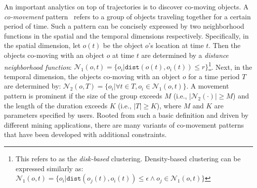 An important analytics on top of trajectories is to discover co-moving objects. A \emph{co-movement} pattern~\cite{li2013effective,zheng2015survey} 
refers to a group of objects traveling together for a certain period of time.
Such a pattern can be concisely expressed by two neighborhood functions in the spatial and the temporal dimensions respectively.
Specifically, in the spatial dimension, let $o(t)$ be the object $o$'s location at time $t$.
Then the objects co-moving with an object $o$
at time $t$ are determined by a 
\emph{distance neighborhood function}:
$\mathcal{N}_1(o,t) = \{o_i | \mathtt{dist}(o(t), o_i(t)) \leq r \}$\footnote{This refers to as the \emph{disk-based} clustering. Density-based clustering can be expressed similarly as: $\mathcal{N}_1(o,t) = \{o_i | \mathtt{dist}(o_j(t), o_i(t)) \leq \epsilon \wedge o_j \in \mathcal{N}_1(o,t) \}$}. Next, in the temporal dimension, the objects co-moving with an object $o$ for a time period $T$ are determined by: $\mathcal{N}_2(o, T) = \{o_i | \forall t \in T, o_i \in \mathcal{N}_1(o,t)\}$.
%
 A movement pattern is prominent if 
the size of the group exceeds $M$ (i.e., $|\mathcal{N}_2(\cdot)| \geq M$) and the length of the duration exceeds $K$ (i.e., $|T| \geq K$), 
where $M$ and $K$ are parameters specified by users. 
Rooted from such a basic definition 
and driven by different mining applications, there are many variants of co-movement patterns that have been developed with additional constraints.


